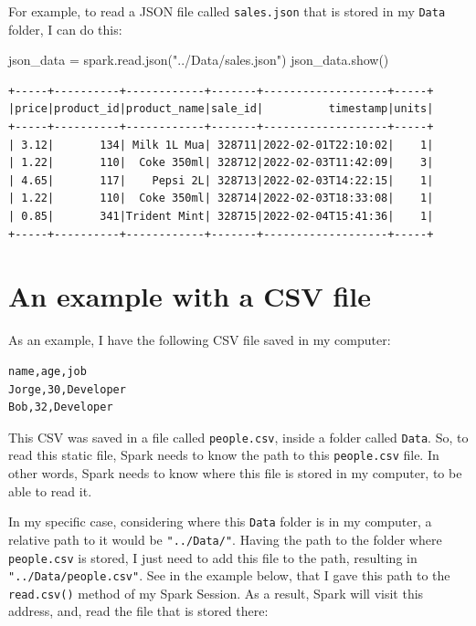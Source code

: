 \documentclass[
  11pt,
  letterpaper,
  DIV=11,
  numbers=noendperiod]{scrreprt}
\newenvironment{Shaded}{\begin{snugshade}}{\end{snugshade}}
\newcommand{\NormalTok}[1]{\textcolor[rgb]{0.00,0.23,0.31}{#1}}
\newcommand{\OperatorTok}[1]{\textcolor[rgb]{0.37,0.37,0.37}{#1}}
\newcommand{\StringTok}[1]{\textcolor[rgb]{0.13,0.47,0.30}{#1}}
\begin{document}
For example, to read a JSON file called \texttt{sales.json} that is
stored in my \texttt{Data} folder, I can do this:

\begin{Shaded}
\begin{Highlighting}[]
\NormalTok{json\_data }\OperatorTok{=}\NormalTok{ spark.read.json(}\StringTok{"../Data/sales.json"}\NormalTok{)}
\NormalTok{json\_data.show()}
\end{Highlighting}
\end{Shaded}

\begin{verbatim}
+-----+----------+------------+-------+-------------------+-----+
|price|product_id|product_name|sale_id|          timestamp|units|
+-----+----------+------------+-------+-------------------+-----+
| 3.12|       134| Milk 1L Mua| 328711|2022-02-01T22:10:02|    1|
| 1.22|       110|  Coke 350ml| 328712|2022-02-03T11:42:09|    3|
| 4.65|       117|    Pepsi 2L| 328713|2022-02-03T14:22:15|    1|
| 1.22|       110|  Coke 350ml| 328714|2022-02-03T18:33:08|    1|
| 0.85|       341|Trident Mint| 328715|2022-02-04T15:41:36|    1|
+-----+----------+------------+-------+-------------------+-----+
\end{verbatim}

\section{An example with a CSV file}\label{an-example-with-a-csv-file}

As an example, I have the following CSV file saved in my computer:

\begin{verbatim}
name,age,job
Jorge,30,Developer
Bob,32,Developer
\end{verbatim}

This CSV was saved in a file called \texttt{people.csv}, inside a folder
called \texttt{Data}. So, to read this static file, Spark needs to know
the path to this \texttt{people.csv} file. In other words, Spark needs
to know where this file is stored in my computer, to be able to read it.

In my specific case, considering where this \texttt{Data} folder is in
my computer, a relative path to it would be \texttt{"../Data/"}. Having
the path to the folder where \texttt{people.csv} is stored, I just need
to add this file to the path, resulting in
\texttt{"../Data/people.csv"}. See in the example below, that I gave
this path to the \texttt{read.csv()} method of my Spark Session. As a
result, Spark will visit this address, and, read the file that is stored
there:
\end{document}

